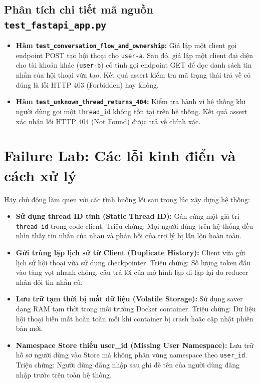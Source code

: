 \subsection{Phân tích chi tiết mã nguồn \texttt{test\_fastapi\_app.py}}
\begin{itemize}
  \item \textbf{Hàm \texttt{test\_conversation\_flow\_and\_ownership}:} Giả lập một client gọi endpoint POST tạo hội thoại cho \texttt{user-a}. Sau đó, giả lập một client đại diện cho tài khoản khác (\texttt{user-b}) cố tình gọi endpoint GET để đọc danh sách tin nhắn của hội thoại vừa tạo. Kết quả assert kiểm tra mã trạng thái trả về có đúng là lỗi HTTP 403 (Forbidden) hay không.
  \item \textbf{Hàm \texttt{test\_unknown\_thread\_returns\_404}:} Kiểm tra hành vi hệ thống khi người dùng gọi một \texttt{thread\_id} không tồn tại trên hệ thống. Kết quả assert xác nhận lỗi HTTP 404 (Not Found) được trả về chính xác.
\end{itemize}

\section{Failure Lab: Các lỗi kinh điển và cách xử lý}

Hãy chủ động làm quen với các tình huống lỗi sau trong lúc xây dựng hệ thống:
\begin{itemize}
  \item \textbf{Sử dụng thread ID tĩnh (Static Thread ID):} Gán cứng một giá trị \texttt{thread\_id} trong code client. Triệu chứng: Mọi người dùng trên hệ thống đều nhìn thấy tin nhắn của nhau và phản hồi của trợ lý bị lẫn lộn hoàn toàn.
  \item \textbf{Gửi trùng lặp lịch sử từ Client (Duplicate History):} Client vừa gửi lịch sử hội thoại vừa sử dụng checkpointer. Triệu chứng: Số lượng token đầu vào tăng vọt nhanh chóng, câu trả lời của mô hình lặp đi lặp lại do reducer nhân đôi tin nhắn cũ.
  \item \textbf{Lưu trữ tạm thời bị mất dữ liệu (Volatile Storage):} Sử dụng saver dạng RAM tạm thời trong môi trường Docker container. Triệu chứng: Dữ liệu hội thoại biến mất hoàn toàn mỗi khi container bị crash hoặc cập nhật phiên bản mới.
  \item \textbf{Namespace Store thiếu user\_id (Missing User Namespace):} Lưu trữ hồ sơ người dùng vào Store mà không phân vùng namespace theo \texttt{user\_id}. Triệu chứng: Người dùng đăng nhập sau ghi đè tên của người dùng đăng nhập trước trên toàn hệ thống.
\end{itemize}

